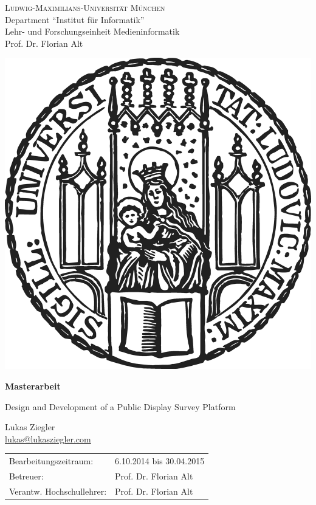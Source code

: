 \documentclass[11pt,a4paper,twoside]{article}
\begin{document}
\pagestyle{empty} %

\begin{center}
\textsc{Ludwig-Maximilians-Universit\"at M\"unchen}\\
Department ``Institut f\"ur Informatik''\\
Lehr- und Forschungseinheit Medieninformatik\\
Prof. Dr. Florian Alt

\vspace{.75cm}
\includegraphics[width=.285\columnwidth]{img/lmu-sigillum.png}
\vspace{.5cm}

{\large\textbf{Masterarbeit}}\vspace{.5cm}

\vspace{2cm}
{\huge Design and Development of a Public Display Survey Platform}
\vspace{2cm}

{\large Lukas Ziegler}\\\href{mailto:lukas@lukasziegler.com}{lukas@lukasziegler.com}

\end{center}
\vfill

\begin{tabular}{ll}
Bearbeitungszeitraum: & 6.10.2014 bis 30.04.2015\\
Betreuer: & Prof. Dr. Florian Alt \\
Verantw. Hochschullehrer: & Prof. Dr. Florian Alt
\end{tabular}

\cleardoublepage

    


\cleardoublepage

    


\cleardoublepage

    

    \vfill %
\end{document}
